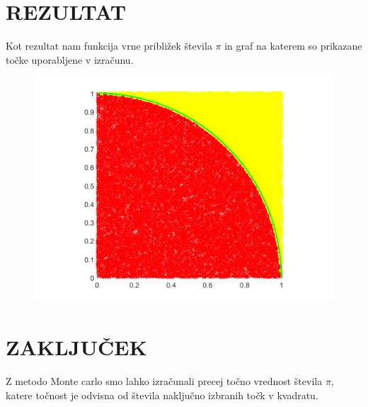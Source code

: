 \documentclass{beamer}
\begin{document}
\section{REZULTAT}
\begin{frame}
    Kot rezultat nam funkcija vrne približek števila $\pi$ in graf na katerem so prikazane točke uporabljene v izračunu.

    \begin{figure}[h!]
        \centering
        \includegraphics[scale=0.55]{graf_pi.png}
    \end{figure}
\end{frame}

\section{ZAKLJUČEK}
\begin{frame}
Z metodo Monte carlo smo lahko izračunali precej točno vrednost števila $\pi$, katere točnost je odvisna od števila naključno izbranih točk v kvadratu.
\end{frame}
\end{document}
